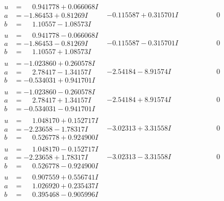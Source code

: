 \documentclass[1p]{elsarticle_modified}
\theoremstyle{definition}
\begin{document}
$$\begin{array}{c|c|c}
\begin{aligned}
u &= \phantom{-}0.941778 + 0.066068 I \\
a &= -1.86453 + 0.81269 I \\
b &= \phantom{-}1.10557 - 1.08573 I\end{aligned}
 & -0.115587 + 0.315701 I & \phantom{-0.000000 } 0 \\ \hline\begin{aligned}
u &= \phantom{-}0.941778 - 0.066068 I \\
a &= -1.86453 - 0.81269 I \\
b &= \phantom{-}1.10557 + 1.08573 I\end{aligned}
 & -0.115587 - 0.315701 I & \phantom{-0.000000 } 0 \\ \hline\begin{aligned}
u &= -1.023860 + 0.260578 I \\
a &= \phantom{-}2.78417 - 1.34157 I \\
b &= -0.534031 + 0.941701 I\end{aligned}
 & -2.54184 - 8.91574 I & \phantom{-0.000000 } 0 \\ \hline\begin{aligned}
u &= -1.023860 - 0.260578 I \\
a &= \phantom{-}2.78417 + 1.34157 I \\
b &= -0.534031 - 0.941701 I\end{aligned}
 & -2.54184 + 8.91574 I & \phantom{-0.000000 } 0 \\ \hline\begin{aligned}
u &= \phantom{-}1.048170 + 0.152717 I \\
a &= -2.23658 - 1.78317 I \\
b &= \phantom{-}0.526778 + 0.924900 I\end{aligned}
 & -3.02313 + 3.31558 I & \phantom{-0.000000 } 0 \\ \hline\begin{aligned}
u &= \phantom{-}1.048170 - 0.152717 I \\
a &= -2.23658 + 1.78317 I \\
b &= \phantom{-}0.526778 - 0.924900 I\end{aligned}
 & -3.02313 - 3.31558 I & \phantom{-0.000000 } 0 \\ \hline\begin{aligned}
u &= \phantom{-}0.907559 + 0.556741 I \\
a &= \phantom{-}1.026920 + 0.235437 I \\
b &= \phantom{-}0.395468 - 0.905996 I\end{aligned}

\end{array}$$
\end{document}
